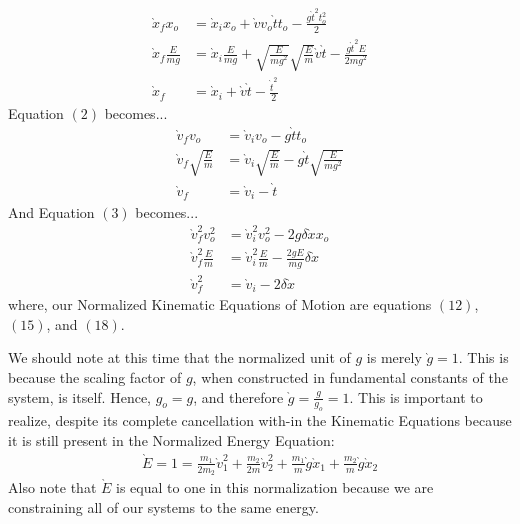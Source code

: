 \documentclass[twocolumn]{article}
\begin{document}
\begin{align}
	\grave{x}_fx_o &= \grave{x}_ix_o + \grave{v}v_o\grave{t}t_o - \frac{g\grave{t}^{2}t_o^{2}}{2} \\
	\grave{x}_f\frac{E}{mg} &= \grave{x}_i\frac{E}{mg} + \sqrt{\frac{E}{mg^{2}}}\sqrt{\frac{E}{m}}\grave{v}\grave{t} - \frac{g\grave{t}^{2}E}{2mg^{2}} \\
	\grave{x}_f &= \grave{x}_i + \grave{v}\grave{t} - \frac{\grave{t}^{2}}{2}
\end{align}
Equation $(2)$ becomes...
\begin{align}
	\grave{v}_fv_o &= \grave{v}_iv_o - g\grave{t}t_o \\
	\grave{v}_f\sqrt{\frac{E}{m}} &= \grave{v}_i\sqrt{\frac{E}{m}} - g\grave{t}\sqrt{\frac{E}{mg^{2}}} \\
	\grave{v}_f &= \grave{v}_i - \grave{t}
\end{align}
And Equation $(3)$ becomes...
\begin{align}	
	\grave{v}_f^{2}v_o^{2} &= \grave{v}_i^{2}v_o^{2} - 2g\delta\grave{x}x_o \\
	\grave{v}_f^{2}\frac{E}{m} &= \grave{v}_i^{2}\frac{E}{m} - \frac{2gE}{mg}\delta\grave{x} \\
	\grave{v}_f^{2} &= \grave{v}_i - 2\delta\grave{x}
\end{align} 
where, our Normalized Kinematic Equations of Motion are equations $(12)$, $(15)$, and $(18)$. 

We should note at this time that the normalized unit of $g$ is merely $\grave{g}=1$. This is because the scaling factor of $g$, when constructed in fundamental constants of the system, is itself. Hence, $g_o=g$, and therefore $\grave{g}=\frac{g}{g_o}=1$. This is important to realize, despite its complete cancellation with-in the Kinematic Equations because it is still present in the Normalized Energy Equation:
\begin{align}
\grave{E}=1=\frac{m_1}{2m_2}\grave{v}_1^{2}+\frac{m_2}{2m}\grave{v}_2^{2}+\frac{m_1}{m}\grave{g}\grave{x}_1+\frac{m_2}{m}\grave{g}\grave{x}_2
\end{align}
Also note that $\grave{E}$ is equal to one in this normalization because we are constraining all of our systems to the same energy.
\end{document}
